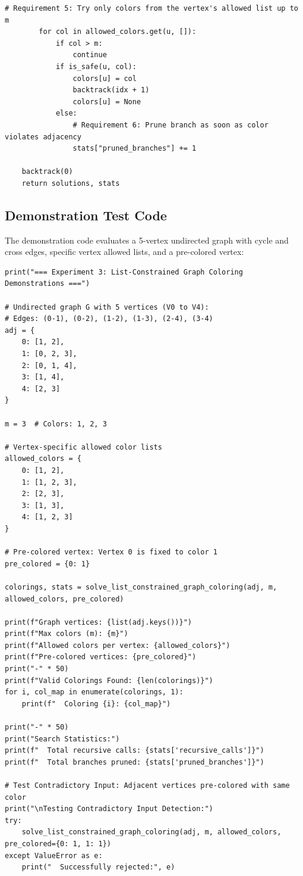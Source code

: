 \documentclass[12pt]{article}
\begin{document}
\begin{lstlisting}[style=code]
        # Requirement 5: Try only colors from the vertex's allowed list up to m
        for col in allowed_colors.get(u, []):
            if col > m:
                continue
            if is_safe(u, col):
                colors[u] = col
                backtrack(idx + 1)
                colors[u] = None
            else:
                # Requirement 6: Prune branch as soon as color violates adjacency
                stats["pruned_branches"] += 1

    backtrack(0)
    return solutions, stats\end{lstlisting}

\subsection{Demonstration Test Code}
The demonstration code evaluates a 5-vertex undirected graph with cycle and cross edges, specific vertex allowed lists, and a pre-colored vertex:

\begin{lstlisting}[style=code]
print("=== Experiment 3: List-Constrained Graph Coloring Demonstrations ===")

# Undirected graph G with 5 vertices (V0 to V4):
# Edges: (0-1), (0-2), (1-2), (1-3), (2-4), (3-4)
adj = {
    0: [1, 2],
    1: [0, 2, 3],
    2: [0, 1, 4],
    3: [1, 4],
    4: [2, 3]
}

m = 3  # Colors: 1, 2, 3

# Vertex-specific allowed color lists
allowed_colors = {
    0: [1, 2],
    1: [1, 2, 3],
    2: [2, 3],
    3: [1, 3],
    4: [1, 2, 3]
}

# Pre-colored vertex: Vertex 0 is fixed to color 1
pre_colored = {0: 1}

colorings, stats = solve_list_constrained_graph_coloring(adj, m, allowed_colors, pre_colored)

print(f"Graph vertices: {list(adj.keys())}")
print(f"Max colors (m): {m}")
print(f"Allowed colors per vertex: {allowed_colors}")
print(f"Pre-colored vertices: {pre_colored}")
print("-" * 50)
print(f"Valid Colorings Found: {len(colorings)}")
for i, col_map in enumerate(colorings, 1):
    print(f"  Coloring {i}: {col_map}")

print("-" * 50)
print("Search Statistics:")
print(f"  Total recursive calls: {stats['recursive_calls']}")
print(f"  Total branches pruned: {stats['pruned_branches']}")

# Test Contradictory Input: Adjacent vertices pre-colored with same color
print("\nTesting Contradictory Input Detection:")
try:
    solve_list_constrained_graph_coloring(adj, m, allowed_colors, pre_colored={0: 1, 1: 1})
except ValueError as e:
    print("  Successfully rejected:", e)\end{lstlisting}
\end{document}
